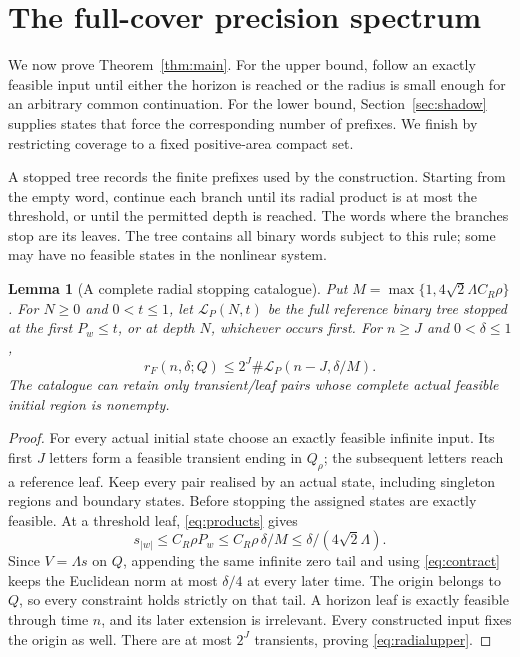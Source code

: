 \documentclass[11pt]{amsart}
\newtheorem{lemma}[theorem]{Lemma}
\theoremstyle{definition}
\theoremstyle{remark}
\numberwithin{equation}{section}
\begin{document}
\section{The full-cover precision spectrum}\label{sec:rates}
We now prove Theorem~\ref{thm:main}. For the upper bound, follow
an exactly feasible input until either the horizon is reached or
the radius is small enough for an arbitrary common continuation.
For the lower bound, Section~\ref{sec:shadow} supplies states
that force the corresponding number of prefixes. We finish by
restricting coverage to a fixed positive-area compact set.

A stopped tree records the finite prefixes used by the construction.
Starting from the empty word, continue each branch until its radial
product is at most the threshold, or until the permitted depth is
reached. The words where the branches stop are its leaves. The tree
contains all binary words subject to this rule; some may have no
feasible states in the nonlinear system.

\begin{lemma}[A complete radial stopping catalogue]\label{lem:stopping}
Put $M=\max\{1,4\sqrt2\Lambda C_R\rho\}$.
For $N\ge0$ and $0<t\le1$, let $\mathcal L_P(N,t)$ be the full
reference binary tree stopped at the first $P_w\le t$, or at
depth $N$, whichever occurs first. For $n\ge J$ and $0<\delta\le1$,
\begin{equation}\label{eq:radialupper}
r_F(n,\delta;Q)\le 2^J\#\mathcal L_P(n-J,\delta/M).
\end{equation}
The catalogue can retain only transient/leaf pairs whose complete
actual feasible initial region is nonempty.
\end{lemma}
\begin{proof}
For every actual initial state choose an exactly feasible infinite
input. Its first $J$ letters form a feasible transient ending in
$Q_\rho$; the subsequent letters reach a reference leaf.
Keep every pair realised by an actual state, including singleton
regions and boundary states. Before stopping the assigned states
are exactly feasible. At a threshold leaf, \eqref{eq:products} gives
\[
s_{|w|}\le C_R\rho P_w\le C_R\rho\,\delta/M
                         \le\delta/(4\sqrt2\Lambda).
\]
Since $V=\Lambda s$ on $Q$, appending the same infinite zero tail
and using \eqref{eq:contract} keeps the Euclidean norm at most
$\delta/4$ at every later time. The origin belongs to $Q$,
so every constraint holds strictly on that tail. A horizon leaf
is exactly feasible through time $n$, and its later extension is
irrelevant. Every constructed input fixes the origin as well.
There are at most $2^J$ transients, proving \eqref{eq:radialupper}.
\end{proof}
\end{document}
